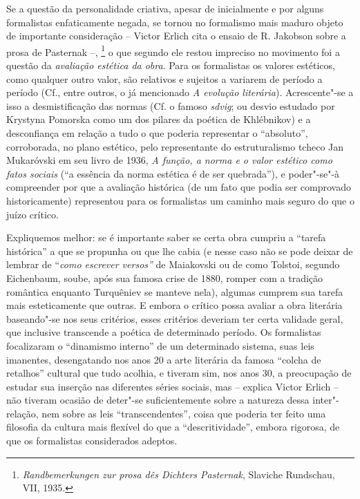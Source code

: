 Se a questão da personalidade criativa, apesar de inicialmente e por
alguns formalistas enfaticamente negada, se tornou no formalismo mais
maduro objeto de importante consideração -- Victor Erlich cita o ensaio
de R. Jakobson sobre a prosa de Pasternak --, \footnote{\emph{Randbemerkungen
  zur prosa dês Dichters Pasternak}, Slaviche Rundschau, VII, 1935.} o
que segundo ele restou impreciso no movimento foi a questão da
\emph{avaliação estética da obra}. Para os formalistas os valores
estéticos, como qualquer outro valor, são relativos e sujeitos a
variarem de período a período (Cf., entre outros, o já mencionado
\emph{A evolução literária}). Acrescente"-se a isso a desmistificação das
normas (Cf. o famoso \emph{sdvig}; ou desvio estudado por Krystyna
Pomorska como um dos pilares da poética de Khlébnikov) e a desconfiança
em relação a tudo o que poderia representar o ``absoluto'', corroborada,
no plano estético, pelo representante do estruturalismo tcheco Jan
Mukaróvski em seu livro de 1936, \emph{A função, a norma e o valor
estético como fatos sociais} (``a essência da norma estética é de ser
quebrada''), e poder"-se"-à compreender por que a avaliação histórica (de
um fato que podia ser comprovado historicamente) representou para os
formalistas um caminho mais seguro do que o juízo crítico.

Expliquemos melhor: se é importante saber se certa obra cumpriu a
``tarefa histórica'' a que se propunha ou que lhe cabia (e nesse caso
não se pode deixar de lembrar de ``\emph{como escrever versos''} de
Maiakovski ou de como Tolstoi, segundo Eichenbaum, soube, após sua
famosa crise de 1880, romper com a tradição romântica enquanto
Turquêniev se manteve nela), algumas cumprem sua tarefa mais
esteticamente que outras. E embora o crítico possa avaliar a obra
literária baseando"-se nos seus critérios, esses critérios deveriam ter
certa validade geral, que inclusive transcende a poética de determinado
período. Os formalistas focalizaram o ``dinamismo interno'' de um
determinado sistema, suas leis imanentes, desengatando nos anos 20 a
arte literária da famosa ``colcha de retalhos'' cultural que tudo
acolhia, e tiveram sim, nos anos 30, a preocupação de estudar sua
inserção nas diferentes séries sociais, mas -- explica Victor Erlich --
não tiveram ocasião de deter"-se suficientemente sobre a natureza dessa
inter"-relação, nem sobre as leis ``transcendentes'', coisa que poderia
ter feito uma filosofia da cultura mais flexível do que a
``descritividade'', embora rigorosa, de que os formalistas considerados
adeptos.

